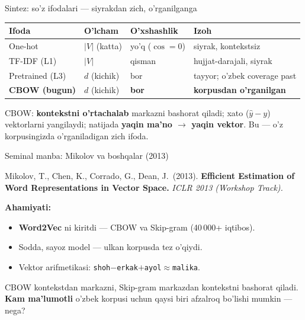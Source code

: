 \documentclass[aspectratio=169,11pt]{beamer}
\begin{document}
\begin{frame}{Sintez: so'z ifodalari --- siyrakdan zich, o'rganilganga}
  \begin{center}\small
  \begin{tabular}{p{2.4cm}p{2.0cm}p{2.4cm}p{3.0cm}}
    \toprule
    \textbf{Ifoda} & \textbf{O'lcham} & \textbf{O'xshashlik} & \textbf{Izoh} \\
    \midrule
    One-hot & $|V|$ (katta) & yo'q ($\cos{=}0$) & siyrak, kontekstsiz \\
    TF-IDF (L1) & $|V|$ & qisman & hujjat-darajali, siyrak \\
    Pretrained (L3) & $d$ (kichik) & bor & tayyor; o'zbek coverage past \\
    \textbf{CBOW (bugun)} & $d$ (kichik) & \textbf{bor} & \textbf{korpusdan o'rganilgan} \\
    \bottomrule
  \end{tabular}
  \end{center}
  \vspace{4pt}
  \begin{tcolorbox}[okbox,title=Asosiy g'oya,top=2pt,bottom=2pt]
    \footnotesize
    CBOW: \textbf{kontekstni o'rtachalab} markazni bashorat qiladi; xato
    ($\hat{y}-y$) vektorlarni yangilaydi; natijada \textbf{yaqin ma'no
    $\to$ yaqin vektor}. Bu --- o'z korpusingizda o'rganiladigan zich ifoda.
  \end{tcolorbox}
\end{frame}

\begin{frame}{Seminal manba: Mikolov va boshqalar (2013)}
  \begin{tcolorbox}[defbox,title=Manba]
    \small
    Mikolov, T., Chen, K., Corrado, G., Dean, J.\ (2013). \textbf{Efficient
    Estimation of Word Representations in Vector Space.} \textit{ICLR 2013
    (Workshop Track).}
  \end{tcolorbox}
  \vspace{5pt}
  \textbf{Ahamiyati:}
  \begin{itemize}\small\setlength\itemsep{3pt}
    \item \textbf{Word2Vec} ni kiritdi --- CBOW va Skip-gram (40\,000+ iqtibos).
    \item Sodda, sayoz model --- ulkan korpusda tez o'qiydi.
    \item Vektor arifmetikasi: \texttt{shoh}$-$\texttt{erkak}$+$\texttt{ayol}$\approx$\texttt{malika}.
  \end{itemize}
  \vspace{5pt}
  \begin{tcolorbox}[warnbox,title=Muhokama savoli (P6 gacha o'ylang)]
    \small
    CBOW kontekstdan markazni, Skip-gram markazdan kontekstni bashorat qiladi.
    \textbf{Kam ma'lumotli} o'zbek korpusi uchun qaysi biri afzalroq bo'lishi
    mumkin --- nega?
  \end{tcolorbox}
\end{frame}
\end{document}
